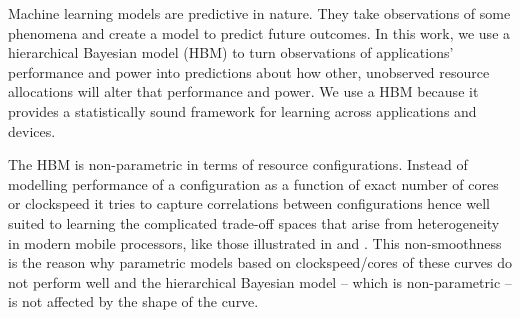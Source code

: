 
Machine learning models are predictive in nature.  They take
observations of some phenomena and create a model to predict future
outcomes. In this work, we use a hierarchical Bayesian model (HBM) to
turn observations of applications' performance and power into
predictions about how other, unobserved resource allocations will
alter that performance and power.  We use a HBM because it provides a
statistically sound framework for learning across applications and
devices.  

The HBM is non-parametric in terms of resource
configurations. Instead of modelling performance of a configuration as a function of exact number of cores or clockspeed it tries to capture correlations between configurations hence well suited to learning the complicated
trade-off spaces that arise from heterogeneity in modern mobile
processors, like those illustrated in  and .  This
non-smoothness is the reason why parametric models based on
clockspeed/cores of these curves do not perform well and the
hierarchical Bayesian model -- which is non-parametric -- is not
affected by the shape of the curve. 

